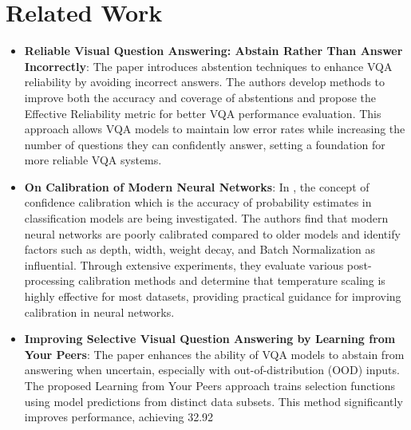 \documentclass[
	english,
	accentcolor=8b,
	type=intern,
	marginpar=false
	]{tudapub}
\begin{document}
\section{Related Work}
\label{sec:relwork}
\begin{itemize}
\item \textbf{Reliable Visual Question Answering: Abstain Rather Than Answer Incorrectly}: The paper \cite{whitehead2022reliablevisualquestionanswering} introduces abstention techniques to enhance VQA reliability by avoiding incorrect answers. The authors develop methods to improve both the accuracy and coverage of abstentions and propose the Effective Reliability metric for better VQA performance evaluation. This approach allows VQA models to maintain low error rates while increasing the number of questions they can confidently answer, setting a foundation for more reliable VQA systems.
\item \textbf{On Calibration of Modern Neural Networks}: In \cite{guo2017calibrationmodernneuralnetworks}, the concept of confidence calibration which is the accuracy of probability estimates in classification models are being investigated. The authors find that modern neural networks are poorly calibrated compared to older models and identify factors such as depth, width, weight decay, and Batch Normalization as influential. Through extensive experiments, they evaluate various post-processing calibration methods and determine that temperature scaling is highly effective for most datasets, providing practical guidance for improving calibration in neural networks.
\item \textbf{Improving Selective Visual Question Answering by Learning from Your Peers}: The paper \cite{dancette2023improvingselectivevisualquestion} enhances the ability of VQA models to abstain from answering when uncertain, especially with out-of-distribution (OOD) inputs. The proposed Learning from Your Peers approach trains selection functions using model predictions from distinct data subsets. This method significantly improves performance, achieving 32.92%
\end{itemize}
\end{document}
